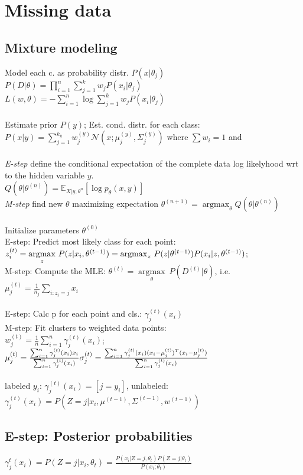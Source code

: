 \section*{Missing data}
\subsection*{Mixture modeling}

Model each c. as probability distr. $P(x|\theta_j)$\\
$P(D|\theta) = \prod_{i=1}^n \sum_{j=1}^k w_j P(x_i|\theta_j)$\\
$L(w, \theta) = - \sum_{i=1}^n \operatorname{log}  \sum_{j=1}^k w_j P(x_i| \theta_j)$\\
\\
Estimate prior $P(y)$; Est. cond. distr. for each class:
$P(x|y) = \sum_{j=1}^{k_y} w_j^{(y)} \mathcal{N}(x; \mu_j^{(y)}, \Sigma_j^{(y)})$ where $\sum w_i = 1$ and \\
\\
\textit{E-step} define the conditional expectation of the complete data log likelyhood wrt to the hidden variable $y$.\\
$Q(\theta|\theta^{(n)}) = \mathbb{E}_{X|y,\theta^{n}} [\log p_\theta(x,y)]$\\
\textit{M-step} find new $\theta$ maximizing expectation
$\theta^{(n+1)} = \operatorname{argmax}_{\theta} Q(\theta|\theta^{(n)})$\\
\\
Initialize parameters $\theta^{(0)}$\\
E-step: Predict most likely class for each point:
$z_i^{(t)} = \underset{z}{\operatorname{argmax}} ~ P(z|x_i, \theta^{(t-1)})\\
= {\operatorname{argmax}_z} ~ P(z|\theta^{(t-1)}) P(x_i|z,\theta^{(t-1)})$;\\
M-step: Compute the MLE: $\theta^{(t)} = \underset{\theta}{\operatorname{argmax}} \ P(D^{(t)}|\theta)$, i.e. $\mu_j^{(t)} = \frac{1}{n_j} \sum_{i: z_i = j} x_i$\\
\\
E-step: Calc p for each point and cls.: $\gamma_j^{(t)}(x_i)$\\
M-step: Fit clusters to weighted data points:\\
$w_j^{(t)} = \frac{1}{n} \sum_{i=1}^n \gamma_j^{(t)} (x_i)$; 
$\mu_j^{(t)} = \frac{\sum_{i=1}^n \gamma_j^{(t)} (x_i) x_i}{\sum_{i=1}^n \gamma_j^{(t)} (x_i)}\\ %
\sigma_j^{(t)} = \frac{\sum_{i=1}^n \gamma_j^{(t)}(x_i) (x_i - \mu_j^{(t)})^T (x_i - \mu_j^{(t)})}{\sum_{i=1}^n \gamma_j^{(t)}(x_i)}$\\
\\
labeled $y_i$: $\gamma_j^{(t)}(x_i) = [j = y_i]$,
unlabeled:\\ $\gamma_j^{(t)}(x_i) = P(Z=j|x_i, \mu^{(t-1)}, \Sigma^{(t-1)}, w^{(t-1)})$


\subsection*{E-step: Posterior probabilities}
$\gamma_j^t(x_i) = P(Z=j|x_i, \theta_t) = \frac{P(x_i|Z=j, \theta_t) P(Z=j|\theta_t)}{P(x_i;\theta_t)}$
